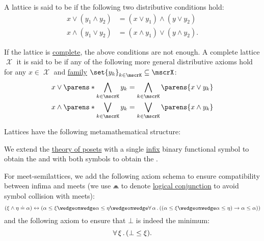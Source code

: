 \begin{definition}
\begin{thmenum}[series=def:semilattice]
     A lattice is said to be  if the following two distributive conditions hold:
    \begin{align}
      x \vee (y_1 \wedge y_2) &= (x \vee y_1) \wedge (y \vee y_2) \label{eq:def:semilattice/distributive_lattice/finite/meet_of_joins} \\
      x \wedge (y_1 \vee y_2) &= (x \wedge y_1) \vee (y \wedge y_2) \label{eq:def:semilattice/distributive_lattice/finite/join_of_meets}.
    \end{align}

    If the lattice is \hyperref[def:semilattice/complete]{complete}, the above conditions are not enough. A complete lattice \( \mscrX \) it is said to be  if any of the following more general distributive axioms hold for any \( x \in \mscrX \) and \hyperref[def:indexed_family]{family} \( \set{ y_k }_{k \in \mscrK} \subseteq \mscrX \):
    \begin{align}
      x \vee \parens*{ \bigwedge_{k \in \mscrK} y_k } &= \bigwedge_{k \in \mscrK} \parens{ x \vee y_k } \label{eq:def:semilattice/distributive_lattice/arbitrary/meet_of_joins} \\
      x \wedge \parens*{ \bigvee_{k \in \mscrK} y_k } &= \bigvee_{k \in \mscrK} \parens{ x \wedge y_k } \label{eq:def:semilattice/distributive_lattice/arbitrary/join_of_meets}
    \end{align}
  \end{thmenum}

  Lattices have the following metamathematical structure:
  \begin{thmenum}[resume=def:semilattice]
     We extend the \hyperref[def:poset/theory]{theory of posets} with a single \hyperref[rem:order_infix_notation]{infix} binary functional symbol to obtain the  and with both symbols to obtain the .

    For meet-semilattices, we add the following axiom schema to ensure compatibility between infima and meets (we use \( \wedgeonwedge \) to denote \hyperref[def:propositional_language/connectives/conjunction]{logical conjunction} to avoid symbol collision with meets):
    \begin{equation}\label{eq:def:semilattice/theory/meet_compat}
      (\xi \wedge \eta \doteq \alpha) \leftrightarrow (\alpha \leq \xi \wedgeonwedge \alpha \leq \eta \wedgeonwedge \qforall \alpha ((\alpha \leq \xi \wedgeonwedge \alpha \leq \eta) \rightarrow \alpha \leq \alpha))
    \end{equation}
    and the following axiom to ensure that \( \bot \) is indeed the minimum:
    \begin{equation}\label{eq:def:semilattice/theory/bottom_compat}
      \forall \thinspace \xi \thinspace . \thinspace (\bot \leq \xi).
    \end{equation}


\end{thmenum}
\end{definition}
